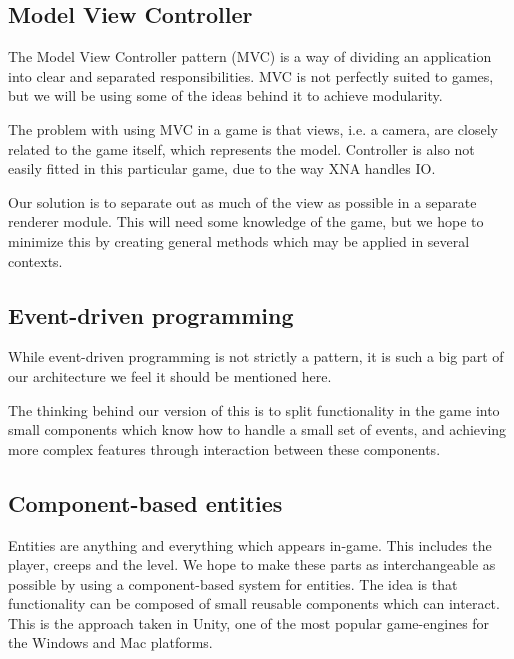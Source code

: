\subsection{Model View Controller}
The Model View Controller pattern (MVC) is a way of dividing an application
into clear and separated responsibilities. MVC is not perfectly suited to 
games, but we will be using some of the ideas behind it to achieve modularity.

The problem with using MVC in a game is that views, i.e. a camera, are closely
related to the game itself, which represents the model.  Controller is also 
not easily fitted in this particular game, due to the way XNA handles IO.

Our solution is to separate out as much of the view as possible in a separate
renderer module.  This will need some knowledge of the game, but we hope to 
minimize this by creating general methods which may be applied in several 
contexts.

\subsection{Event-driven programming}
While event-driven programming is not strictly a pattern, it is such a big 
part of our architecture we feel it should be mentioned here.

The thinking behind our version of this is to split functionality in the game
into small components which know how to handle a small set of events, and 
achieving more complex features through interaction between these components.

\subsection{Component-based entities}
Entities are anything and everything which appears in-game.  This includes the
player, creeps and the level.  We hope to make these parts as interchangeable 
as possible by using a component-based system for entities.  The idea is that
functionality can be composed of small reusable components which can interact.
This is the approach taken in Unity, one of the most popular game-engines for 
the Windows and Mac platforms.